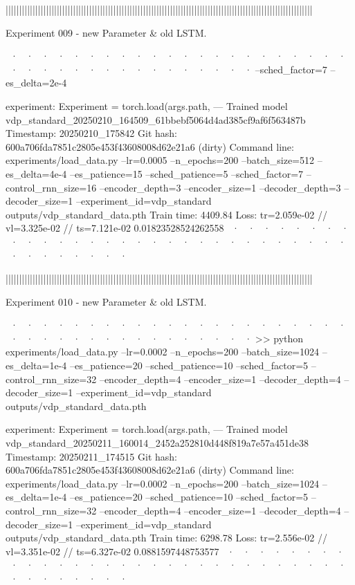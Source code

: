 ||||||||||||||||||||||||||||||||||||||||||||||||||||||||||||||||||||||||||||||||||||||||||||||||||||||||||||||||||


Experiment 009 - new Parameter & old LSTM. 


~· ~· ~· ~· ~· ~· ~· ~· ~· ~· ~· ~· ~· ~· ~· ~· ~· ~· ~· ~· ~· ~· ~· ~· ~· ~· ~· ~· ~· ~· ~· ~· ~· ~· ~· ~· ~· ~· 
--sched_factor=7  
--es_delta=2e-4


  experiment: Experiment = torch.load(args.path,
--- Trained model   vdp_standard_20250210_164509_61bbebf5064d4ad385cf9af6f563487b
Timestamp:      20250210_175842
Git hash:       600a706fda7851c2805e453f43608008d62e21a6 (dirty)
Command line:   experiments/load_data.py --lr=0.0005 --n_epochs=200 --batch_size=512 --es_delta=4e-4 --es_patience=15 --sched_patience=5 --sched_factor=7 --control_rnn_size=16 --encoder_depth=3 --encoder_size=1 --decoder_depth=3 --decoder_size=1 --experiment_id=vdp_standard outputs/vdp_standard_data.pth
Train time:     4409.84
Loss:           tr=2.059e-02 // vl=3.325e-02 // ts=7.121e-02
0.01823528524262558
~· ~· ~· ~· ~· ~· ~· ~· ~· ~· ~· ~· ~· ~· ~· ~· ~· ~· ~· ~· ~· ~· ~· ~· ~· ~· ~· ~· ~· ~· ~· ~· ~· ~· ~· ~· ~· ~· 



||||||||||||||||||||||||||||||||||||||||||||||||||||||||||||||||||||||||||||||||||||||||||||||||||||||||||||||||||


Experiment 010 - new Parameter & old LSTM. 


~· ~· ~· ~· ~· ~· ~· ~· ~· ~· ~· ~· ~· ~· ~· ~· ~· ~· ~· ~· ~· ~· ~· ~· ~· ~· ~· ~· ~· ~· ~· ~· ~· ~· ~· ~· ~· ~· 
>> python experiments/load_data.py --lr=0.0002 --n_epochs=200 --batch_size=1024 --es_delta=1e-4 --es_patience=20 --sched_patience=10 --sched_factor=5 --control_rnn_size=32 --encoder_depth=4 --encoder_size=1 --decoder_depth=4 --decoder_size=1 --experiment_id=vdp_standard outputs/vdp_standard_data.pth


  experiment: Experiment = torch.load(args.path,
--- Trained model   vdp_standard_20250211_160014_2452a252810d448f819a7e57a451de38
Timestamp:      20250211_174515
Git hash:       600a706fda7851c2805e453f43608008d62e21a6 (dirty)
Command line:   experiments/load_data.py --lr=0.0002 --n_epochs=200 --batch_size=1024 --es_delta=1e-4 --es_patience=20 --sched_patience=10 --sched_factor=5 --control_rnn_size=32 --encoder_depth=4 --encoder_size=1 --decoder_depth=4 --decoder_size=1 --experiment_id=vdp_standard outputs/vdp_standard_data.pth
Train time:     6298.78
Loss:           tr=2.556e-02 // vl=3.351e-02 // ts=6.327e-02
0.0881597448753577
~· ~· ~· ~· ~· ~· ~· ~· ~· ~· ~· ~· ~· ~· ~· ~· ~· ~· ~· ~· ~· ~· ~· ~· ~· ~· ~· ~· ~· ~· ~· ~· ~· ~· ~· ~· ~· ~· 




